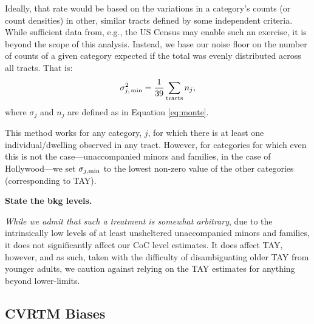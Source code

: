 \documentclass[11pt,twocolumn]{article}
\def\bfr{\bf\color{red}}
\begin{document}
Ideally, that rate would be based on the variations in a category's counts (or count densities) in other, 
similar tracts defined by some independent criteria. While sufficient data from, e.g., the US Census 
may enable such an exercise, it is beyond the scope of this analysis. Instead, we base our noise floor 
on the number of counts of a given category expected if the total was evenly distributed across 
all tracts. That is:
\begin{equation}
	\sigma_{j,\,\rm min}^{2} = \frac{1}{39}\sum_{\rm tracts}n_{j},
\end{equation}
where $\sigma_{j}$ and $n_{j}$ are defined as in Equation \ref{eq:monte}.

This method works for any category, $j$, for which there is at least one individual/dwelling observed in any 
tract. However, for categories for which even this is not the case---unaccompanied minors and families, in the
case of Hollywood---we set $\sigma_{j, \rm min}$ to the lowest non-zero value of the other categories
(corresponding to TAY).

{\bfr State the bkg levels.}

{\it While we admit that such a treatment is 
somewhat arbitrary}, due to the intrinsically low levels of at least unsheltered unaccompanied minors 
and families, it does not significantly affect our CoC level estimates. It does affect TAY, however, and
as such, taken with the difficulty of disambiguating older TAY from younger adults, we caution against 
relying on the TAY estimates for anything beyond lower-limits.

\subsection{CVRTM Biases}
\label{sec:CVRTM}
\end{document}
